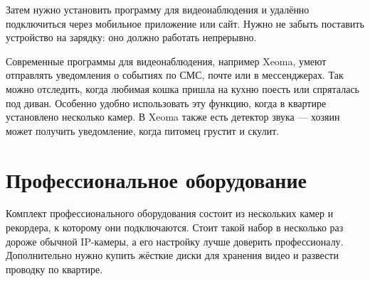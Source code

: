 Затем нужно установить программу для видеонаблюдения и удалённо подключиться через мобильное приложение или сайт. Нужно не забыть поставить устройство на зарядку: оно должно работать непрерывно.

Современные программы для видеонаблюдения, например Xeoma, умеют отправлять уведомления о событиях по СМС, почте или в мессенджерах. Так можно отследить, когда любимая кошка пришла на кухню поесть или спряталась под диван. Особенно удобно использовать эту функцию, когда в квартире установлено несколько камер. В Xeoma также есть детектор звука — хозяин может получить уведомление, когда питомец грустит и скулит.

\section{Профессиональное оборудование}

Комплект профессионального оборудования состоит из нескольких камер и рекордера, к которому они подключаются. Стоит такой набор в несколько раз дороже обычной IP-камеры, а его настройку лучше доверить профессионалу. Дополнительно нужно купить жёсткие диски для хранения видео и развести проводку по квартире.

